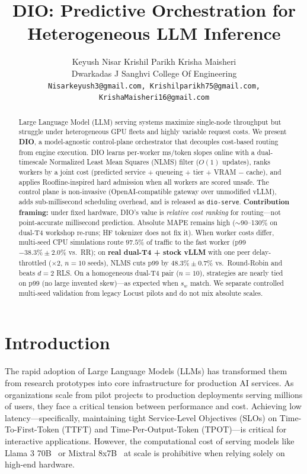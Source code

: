 \documentclass[10pt,twocolumn,letterpaper]{article}
\title{DIO: Predictive Orchestration for Heterogeneous LLM Inference}
\author{
    Keyush Nisar \qquad Krishil Parikh \qquad Krisha Maisheri \\
    Dwarkadas J Sanghvi College Of Engineering \\
    {\tt\small Nisarkeyush3@gmail.com, Krishilparikh75@gmail.com, KrishaMaisheri16@gmail.com}
}
\begin{document}
\maketitle

\begin{abstract}
Large Language Model (LLM) serving systems maximize single-node throughput but struggle under heterogeneous GPU fleets and highly variable request costs. We present \textbf{DIO}, a model-agnostic control-plane orchestrator that decouples cost-based routing from engine execution. DIO learns per-worker ms/token slopes online with a dual-timescale Normalized Least Mean Squares (NLMS) filter ($O(1)$ updates), ranks workers by a joint cost (predicted service $+$ queueing $+$ tier $+$ VRAM $-$ cache), and applies Roofline-inspired hard admission when all workers are scored unsafe. The control plane is non-invasive (OpenAI-compatible gateway over unmodified vLLM), adds sub-millisecond scheduling overhead, and is released as \texttt{dio-serve}. \textbf{Contribution framing:} under fixed hardware, DIO's value is \emph{relative cost ranking} for routing---not point-accurate millisecond prediction. Absolute MAPE remains high ($\sim$90--130\% on dual-T4 workshop re-runs; HF tokenizer does not fix it). When worker costs differ, multi-seed CPU simulations route $97.5\%$ of traffic to the fast worker (p99 $-38.3\%\pm2.0\%$ vs.\ RR); on \textbf{real dual-T4 + stock vLLM} with one peer delay-throttled ($\times 2$, $n{=}10$ seeds), NLMS cuts p99 by \textbf{$48.3\%\pm0.7\%$} vs.\ Round-Robin and beats $d{=}2$ RLS. On a homogeneous dual-T4 pair ($n{=}10$), strategies are nearly tied on p99 (no large invented skew)---as expected when $s_w$ match. We separate controlled multi-seed validation from legacy Locust pilots and do not mix absolute scales.
\end{abstract}

\section{Introduction}
\label{sec:intro}

The rapid adoption of Large Language Models (LLMs) has transformed them from research prototypes into core infrastructure for production AI services. As organizations scale from pilot projects to production deployments serving millions of users, they face a critical tension between performance and cost. Achieving low latency---specifically, maintaining tight Service-Level Objectives (SLOs) on Time-To-First-Token (TTFT) and Time-Per-Output-Token (TPOT)---is critical for interactive applications. However, the computational cost of serving models like Llama 3 70B~\cite{meta2024llama3} or Mixtral 8x7B~\cite{jiang2023mixtral} at scale is prohibitive when relying solely on high-end hardware.
\end{document}
